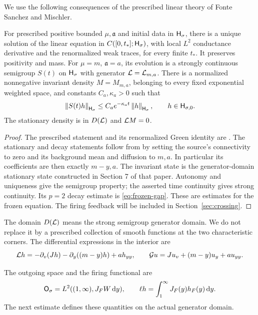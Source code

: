 We use the following consequences of the prescribed linear theory of
Fonte Sanchez and Mischler.

\begin{proposition}\label{prop:frozen}
For prescribed positive bounded $\mu,\mathfrak a$ and initial data in
$\mathsf H_\sigma$, there is a unique solution of the linear equation in
$C([0,t_*];\mathsf H_\sigma)$, with local $L^2$ conductance derivative and the
renormalized weak traces, for every finite $t_*$. It preserves positivity
and mass. For $\mu=m$, $\mathfrak a=a$, its evolution is a strongly continuous
semigroup $S(t)$ on $\mathsf H_\sigma$ with generator $\mathcal L=\mathcal L_{m,a}$.
There is a normalized nonnegative invariant density $M=M_{m,a}$, belonging
to every fixed exponential weighted space, and constants $C_a,\kappa_a>0$
such that
\begin{equation}\label{eq:frozen-gap}
 \left\|S(t)h\right\|_{\mathsf H_\sigma}\le C_a e^{-\kappa_a t}
           \left\|h\right\|_{\mathsf H_\sigma},\qquad h\in\mathsf H_{\sigma,0}.
\end{equation}
The stationary density is in $D(\mathcal L)$ and $\mathcal L M=0$.
\end{proposition}

\begin{proof}
The prescribed statement and its renormalized Green identity are
\cite[Theorem 2.2 and (2.18)--(2.19)]{FM24}. The stationary and decay
statements follow from \cite[Theorem 1.2]{FM24} by setting the source's
connectivity to zero and its background mean and diffusion to $m,a$.
In particular its coefficients are then exactly $m-y,a$. The invariant
state is the generator-domain stationary state constructed in Section 7
of that paper. Autonomy and uniqueness give the semigroup property;
the asserted time continuity gives strong continuity. Its $p=2$ decay
estimate is \eqref{eq:frozen-gap}. These are estimates for the frozen
equation. The firing feedback will be included in Section~\ref{sec:crossing}.
\end{proof}

The domain $D(\mathcal L)$ means the strong semigroup generator domain. We do not
replace it by a prescribed collection of smooth functions at the two
characteristic corners. The differential expressions in the interior are
\[
 \mathcal L h=-\partial_v(Jh)-\partial_y((m-y)h)+ah_{yy},
 \qquad
 \mathcal G u=Ju_v+(m-y)u_y+au_{yy}.
\]

The outgoing space and the firing functional are
\begin{equation}\label{eq:out-space}
 \mathsf O_\sigma=L^2((1,\infty),J_FW\,\mathrm d y),\qquad
 \ell h=\int_1^\infty J_F(y)h_F(y)\,\mathrm d y.
\end{equation}
The next estimate defines these quantities on the actual generator domain.

